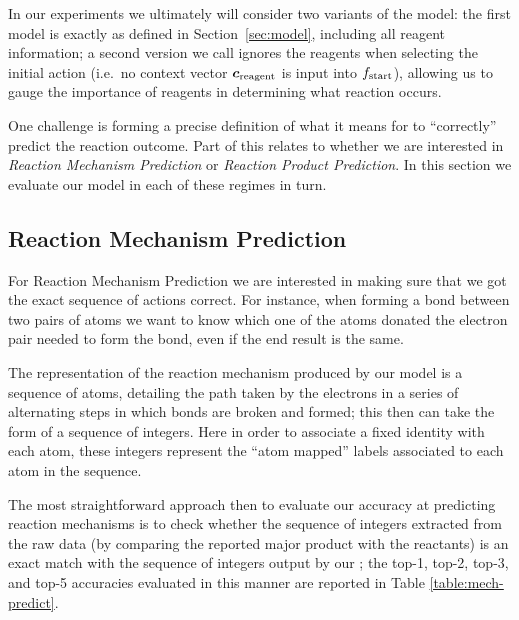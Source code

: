 

In our experiments we ultimately will consider two variants of the model: 
the first model \ourModelR  is exactly as defined in Section\ \ref{sec:model}, including all reagent information;
a second version we call \ourModelIR ignores the reagents when selecting the initial action (i.e.\ no context vector $\bm{c}_\mathrm{reagent}$ is input into $f_{\textrm{start}}$), 
allowing us to gauge the importance of reagents in determining what reaction occurs.

One challenge is forming a precise definition of what it means for to ``correctly'' predict the reaction outcome. 
Part of this relates to whether we are interested in  \emph{Reaction Mechanism Prediction} or \emph{Reaction Product Prediction}.  
In this section we evaluate our model in each of these regimes in turn.

\subsection{Reaction Mechanism Prediction}

 For Reaction Mechanism Prediction we are interested in making sure that we got the exact sequence of actions correct.
For instance, when forming a bond between two pairs of atoms we want to know which one of the atoms donated the electron pair needed to form the bond, even if the end result is the same. 

The representation of the reaction mechanism produced by our model is a sequence of atoms, detailing the path taken by the electrons in a series of alternating steps in which bonds are broken and formed; this then can take the form of a sequence of integers.
Here in order to associate a fixed identity with each atom, these integers represent the ``atom mapped'' labels associated to each atom in the sequence.

The most straightforward approach then to evaluate our accuracy at predicting reaction mechanisms is to check whether the sequence of integers extracted from the raw data (by comparing the reported major product with the reactants) is an exact match with the sequence of integers output by our \ourModel; the top-1, top-2, top-3, and top-5 accuracies evaluated in this manner are reported in Table \ref{table:mech-predict}.

